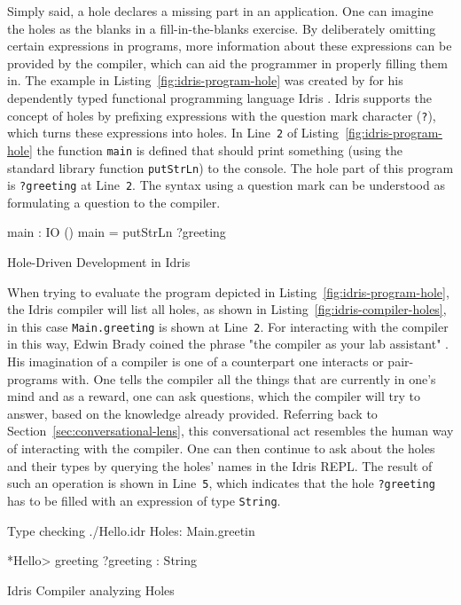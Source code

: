 Simply said, a hole declares a missing part in an application.
One can imagine the holes as the blanks in a fill-in-the-blanks exercise.
By deliberately omitting certain expressions in programs, more information about these expressions can be provided by the compiler, which can aid the programmer in properly filling them in.
The example in Listing~\ref{fig:idris-program-hole} was created by \citeauthor{brady_type-driven_2017} for his dependently typed functional programming language Idris \cite{brady_type-driven_2017}.
Idris supports the concept of holes by prefixing expressions with the question mark character (\texttt{?}), which turns these expressions into holes.
In Line~\verb|2| of Listing~\ref{fig:idris-program-hole} the function \verb|main| is defined that should print something (using the standard library function \verb|putStrLn|) to the console.
The hole part of this program is \verb|?greeting| at Line~\verb|2|.
The syntax using a question mark can be understood as formulating a question to the compiler.

\begin{program}
\begin{GenericCode}
main : IO ()
main = putStrLn ?greeting
\end{GenericCode}
\caption{Hole-Driven Development in Idris}
\label{fig:idris-program-hole}
\end{program}

When trying to evaluate the program depicted in Listing~\ref{fig:idris-program-hole}, the Idris compiler will list all holes, as shown in Listing~\ref{fig:idris-compiler-holes}, in this case \texttt{Main.greeting} is shown at Line~\verb|2|.
For interacting with the compiler in this way, Edwin Brady coined the phrase "the compiler as your lab assistant" \cite{brady_type-driven_2017}.
His imagination of a compiler is one of a counterpart one interacts or pair-programs with.
One tells the compiler all the things that are currently in one's mind and as a reward, one can ask questions, which the compiler will try to answer, based on the knowledge already provided.
Referring back to Section~\ref{sec:conversational-lens}, this conversational act resembles the human way of interacting with the compiler.
One can then continue to ask about the holes and their types by querying the holes' names in the Idris REPL.
The result of such an operation is shown in Line~\verb|5|, which indicates that the hole \texttt{?greeting} has to be filled with an expression of type \texttt{String}.

\begin{program}
\begin{GenericCode}
Type checking ./Hello.idr
Holes: Main.greetin

*Hello> greeting
?greeting : String
\end{GenericCode}
\caption{Idris Compiler analyzing Holes}
\label{fig:idris-compiler-holes}
\end{program}


